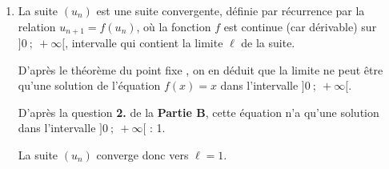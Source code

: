 \documentclass[10pt]{article}
\begin{document}
\begin{enumerate}
La suite étant croissante et majorée, on en déduit qu'elle est convergente, vers une limite $\ell$ vérifiant $\dfrac{1}{2} \leqslant \ell \leqslant 1$
		\item  La suite $\left(u_n\right)$ est une suite convergente, définie par récurrence par la relation $u_{n+1} = f\left(u_n\right)$, où la fonction $f$ est continue (car dérivable) sur $]0~;~+\infty[$, intervalle qui contient la limite $\ell$ de la suite.

D'après le théorème \og du point fixe \fg{}, on en déduit que la limite ne peut être qu'une solution de l'équation $f(x) = x$ dans l'intervalle  $]0~;~+\infty[$.

D'après la question \textbf{2.} de la \textbf{Partie B}, cette équation n'a qu'une solution dans  l'intervalle $]0~;~+\infty[$ :  1.

La suite $\left(u_n\right)$ converge donc vers $\ell = 1$.
\end{enumerate}

\bigskip
\end{document}
